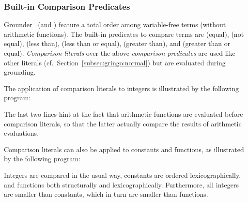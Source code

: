 \subsubsection{Built-in Comparison Predicates}\label{subsec:gringo:comp}

Grounder \gringo\ (and \clingo)
feature a total order among variable-free terms (without arithmetic functions).
The built-in predicates to compare terms are
\code{=} (equal),
\code{!=} (not equal),
\code{<} (less than),
\code{<=} (less than or equal),
\code{>} (greater than), and
\code{>=} (greater than or equal).
\emph{Comparison literals} over the above \emph{comparison predicates} are used like
other literals (cf.\ Section~\ref{subsec:gringo:normal})
but are evaluated during grounding.

\begin{example}\label{ex:arith:pred}
The application of comparison literals to integers
is illustrated by the following program:%
%

%
The last two lines hint at the fact that arithmetic functions are evaluated
before comparison literals, so that the latter actually compare the
results of arithmetic evaluations.
\end{example}

\begin{example}\label{ex:symb:pred}
Comparison literals can also be applied to constants and functions,
as illustrated by the following program:%
%

%
Integers are compared in the usual way, constants are ordered lexicographically,
and functions both structurally and lexicographically.
Furthermore, all integers are smaller than constants,
which in turn are smaller than functions.
\end{example}


